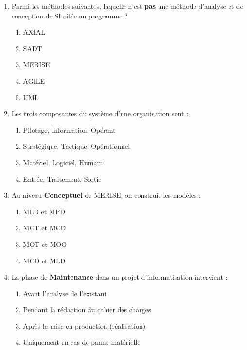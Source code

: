 \documentclass[11pt]{article}
\begin{document}
\begin{exercice}
\begin{enumerate}
    \item Parmi les méthodes suivantes, laquelle n'est \textbf{pas} une méthode d'analyse et de conception de SI citée au programme ?
    \begin{enumerate}
        \item AXIAL \item SADT \item MERISE \item AGILE \item UML
    \end{enumerate}
    \item Les trois composantes du système d'une organisation sont :
    \begin{enumerate}
        \item Pilotage, Information, Opérant
        \item Stratégique, Tactique, Opérationnel
        \item Matériel, Logiciel, Humain
        \item Entrée, Traitement, Sortie
    \end{enumerate}
    \item Au niveau \textbf{Conceptuel} de MERISE, on construit les modèles :
    \begin{enumerate}
        \item MLD et MPD
        \item MCT et MCD
        \item MOT et MOO
        \item MCD et MLD
    \end{enumerate}
    \item La phase de \textbf{Maintenance} dans un projet d'informatisation intervient :
    \begin{enumerate}
        \item Avant l'analyse de l'existant
        \item Pendant la rédaction du cahier des charges
        \item Après la mise en production (réalisation)
        \item Uniquement en cas de panne matérielle
    \end{enumerate}
\end{enumerate}
\end{exercice}
\end{document}
